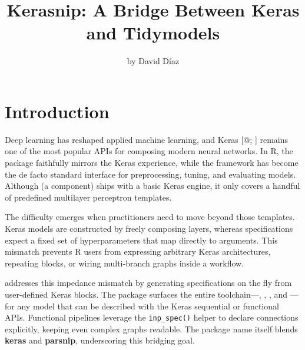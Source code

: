 \title{Kerasnip: A Bridge Between Keras and Tidymodels}


\author{by David Díaz}

\maketitle


\section{Introduction}\label{introduction}

Deep learning \citep{Goodfellow-et-al-2016} has reshaped applied machine learning, and Keras {[}@; \citet{chollet2015keras}{]} remains one of the most popular APIs for composing modern neural networks. In R, the  package faithfully mirrors the Keras experience, while the  framework \citep{tidymodels} has become the de facto standard interface for preprocessing, tuning, and evaluating models. Although  (a  component) ships with a basic Keras engine, it only covers a handful of predefined multilayer perceptron templates.

The difficulty emerges when practitioners need to move beyond those templates. Keras models are constructed by freely composing layers, whereas  specifications expect a fixed set of hyperparameters that map directly to arguments. This mismatch prevents R users from expressing arbitrary Keras architectures, repeating blocks, or wiring multi-branch graphs inside a  workflow.

 addresses this impedance mismatch by generating  specifications on the fly from user-defined Keras blocks. The package surfaces the entire  toolchain---, , , and ---for any model that can be described with the Keras sequential or functional APIs. Functional pipelines leverage the \texttt{inp\_spec()} helper to declare connections explicitly, keeping even complex graphs readable. The package name itself blends \textbf{keras} and \textbf{parsnip}, underscoring this bridging goal.

